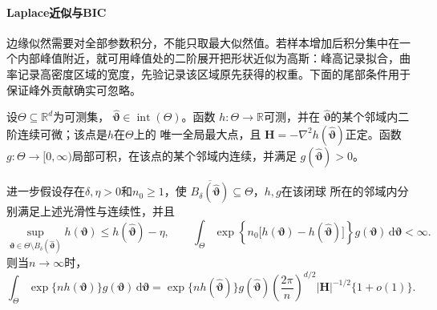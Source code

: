 \paragraph{Laplace近似与BIC}
边缘似然需要对全部参数积分，不能只取最大似然值。若样本增加后积分集中在一个内部峰值附近，就可用峰值处的二阶展开把形状近似为高斯：峰高记录拟合，曲率记录高密度区域的宽度，先验记录该区域原先获得的权重。下面的尾部条件用于保证峰外贡献确实可忽略。
\begin{theorem}[固定维Laplace局部积分近似]
\label{thm:statistics-laplace-approximation}
设\(\Theta\subseteq\mathbb{R}^d\)为可测集，
\(\widehat{\bm\vartheta}\in\operatorname{int}(\Theta)\)。函数
\(h:\Theta\to\mathbb{R}\)可测，并在
\(\widehat{\bm\vartheta}\)的某个邻域内二阶连续可微；该点是\(h\)在\(\Theta\)上的
唯一全局最大点，且
\(\bm H=-\nabla^2h(\widehat{\bm\vartheta})\)正定。函数
\(g:\Theta\to[0,\infty)\)局部可积，在该点的某个邻域内连续，并满足
\(g(\widehat{\bm\vartheta})>0\)。

进一步假设存在\(\delta,\eta>0\)和\(n_0\geq1\)，使
\(\overline{B_\delta(\widehat{\bm\vartheta})}\subseteq\Theta\)，\(h,g\)在该闭球
所在的邻域内分别满足上述光滑性与连续性，并且
\[
  \sup_{\bm\vartheta\in
    \Theta\setminus B_\delta(\widehat{\bm\vartheta})}
  h(\bm\vartheta)
  \leq h(\widehat{\bm\vartheta})-\eta,
  \qquad
  \int_\Theta
  \exp\!\left\{n_0\bigl[h(\bm\vartheta)
    -h(\widehat{\bm\vartheta})\bigr]\right\}
  g(\bm\vartheta)\,\mathrm d\bm\vartheta<\infty.
\]
则当\(n\to\infty\)时，
\[
  \int_\Theta \exp\{n h(\bm\vartheta)\}g(\bm\vartheta)\,
  \mathrm d\bm\vartheta
  =
  \exp\{nh(\widehat{\bm\vartheta})\}
  g(\widehat{\bm\vartheta})
  \left(\frac{2\pi}{n}\right)^{d/2}
  |\bm H|^{-1/2}\{1+o(1)\}.
\]
\end{theorem}

